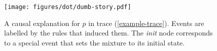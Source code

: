 \begin{figure}[H]
  \vskip -0.8cm
  \begin{center}
    \texttt{[image: figures/dot/dumb-story.pdf]}
  \end{center}
  \vskip -1cm
  \caption{A causal explanation for $p$ in trace
    (\ref{example-trace}).  Events are labelled by the rules that
    induced them. The \emph{init} node corresponds to a special event
    that sets the mixture to its initial state.  }
  \label{fig:dumb-story}
\end{figure}
